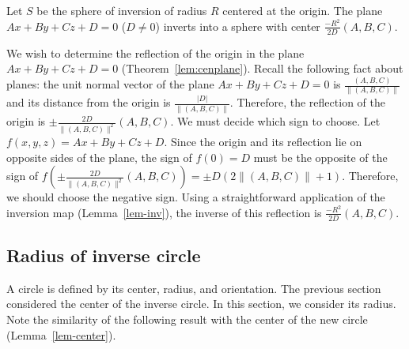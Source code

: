\begin{lemma}
\label{cor-plane}
Let $S$ be the sphere of inversion of radius $R$ centered at the origin.
The plane $Ax+By+Cz+D=0$ ($D \neq 0$) inverts into a sphere with center
$\frac{-R^{2}}{2D} (A,B,C)$.
\end{lemma}
We wish to determine the reflection of the origin in 
the plane $Ax+By+Cz+D=0$ (Theorem~\ref{lem:cenplane}).
Recall the following fact about planes: 
the unit normal vector of the plane $Ax+By+Cz+D=0$
is $\frac{(A,B,C)}{\|(A,B,C)\|}$
and its distance from the origin is $\frac{|D|}{\|(A,B,C)\|}$.
Therefore, the reflection of the origin is 
$\pm \frac{2D}{\|(A,B,C)\|^{2}} (A,B,C)$.
We must decide which sign to choose.
Let $f(x,y,z) = Ax+By+Cz+D$.
Since the origin and its reflection lie on opposite sides of the plane,
the sign of $f(0) = D$ must be the opposite of the sign of 
$f(\pm \frac{2D}{\|(A,B,C)\|^{2}} (A,B,C)) = \pm D (2\|(A,B,C)\| + 1)$.
Therefore, we should choose the negative sign.
Using a straightforward application of the inversion map (Lemma~\ref{lem-inv}),
the inverse of this reflection is $\frac{-R^{2}}{2D} (A,B,C)$.
\QED



\subsection{Radius of inverse circle}

A circle is defined by its center, radius, and orientation.
The previous section considered the center of the inverse circle.
In this section, we consider its radius.
Note the similarity of the following result with the center of the new circle 
(Lemma~\ref{lem-center}).



